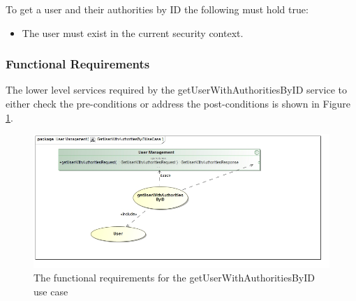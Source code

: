 To get a user and their authorities by ID the following must hold true:
\begin{itemize}
	\item The user must exist in the current security context.
\end{itemize}

\subsubsection{Functional Requirements}
The lower level services required by the getUserWithAuthoritiesByID service to either check the
pre-conditions or address the post-conditions is shown in Figure \ref{getUserWithAuthoritiesByIDUseCase}.

\begin{figure}[H]
	\begin{center}
		\includegraphics[scale=0.5]{../Diagrams and Charts/Users/Get User With Authorities By ID Use Case.jpg}
		\caption{The functional requirements for the getUserWithAuthoritiesByID use case}
		\label{getUserWithAuthoritiesByIDUseCase}
	\end{center}	
\end{figure}